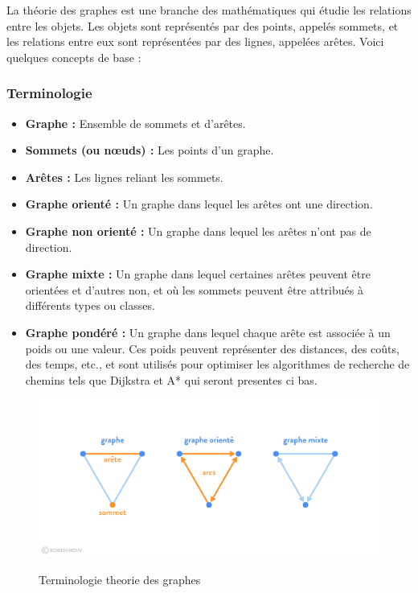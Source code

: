 \documentclass{article}
\begin{document}
La théorie des graphes est une branche des mathématiques qui étudie les relations entre les objets. Les objets sont représentés par des points, appelés sommets, et les relations entre eux sont représentées par des lignes, appelées arêtes. Voici quelques concepts de base :

\subsubsection{Terminologie}

\begin{itemize}
    \item \textbf{Graphe :} Ensemble de sommets et d'arêtes.
    \item \textbf{Sommets (ou nœuds) :} Les points d'un graphe.
    \item \textbf{Arêtes :} Les lignes reliant les sommets.
    \item \textbf{Graphe orienté :} Un graphe dans lequel les arêtes ont une direction.
    \item \textbf{Graphe non orienté :} Un graphe dans lequel les arêtes n'ont pas de direction.
    \item \textbf{Graphe mixte :} Un graphe dans lequel certaines arêtes peuvent être orientées et d'autres non, et où les sommets peuvent être attribués à différents types ou classes.
    \item \textbf{Graphe pondéré :} Un graphe dans lequel chaque arête est associée à un poids ou une valeur. Ces poids peuvent représenter des distances, des coûts, des temps, etc., et sont utilisés pour optimiser les algorithmes de recherche de chemins tels que Dijkstra et A* qui seront presentes ci bas.
\end{itemize}


\begin{figure}[h]
    \centering
    \includegraphics[width=0.9\linewidth]{Images/sommets.png}
    \caption{Terminologie theorie des graphes}
    \cite{graph_image2}
\end{figure}
\end{document}
